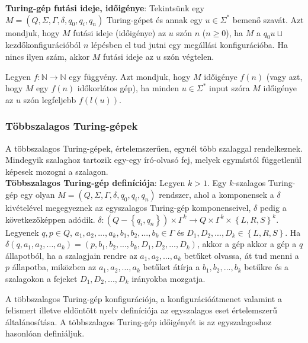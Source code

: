 \documentclass[margin=0px]{article}
\begin{document}
	\noindent \textbf{Turing-gép futási ideje, időigénye}:
	Tekintsünk egy $M = (Q, \Sigma, \Gamma, \delta, q_{0}, q_{i}, q_{n})$ Turing-gépet és annak egy
	$u \in \Sigma^{*}$ bemenő szavát. Azt mondjuk, hogy $M$ futási ideje (időigénye) az $u$ szón $n$ ($n \geq 0$),
	ha $M$ a $q_{0}u\sqcup$ kezdőkonfigurációból $n$ lépésben el tud jutni egy megállási konfigurációba. Ha nincs ilyen
	szám, akkor $M$ futási ideje az $u$ szón végtelen.
	
	Legyen $f : \mathbb{N} \to \mathbb{N}$ egy függvény. Azt mondjuk, hogy $M$ időigénye $f(n)$ (vagy azt, hogy $M$
	egy $f(n)$ időkorlátos gép), ha minden $u \in \Sigma^{*}$ input szóra $M$ időigénye az $u$ szón legfeljebb $f(l(u))$.
	
	\subsubsection{Többszalagos Turing-gépek}
	
	A többszalagos Turing-gépek, értelemszerűen, egynél több szalaggal rendelkeznek.
	Mindegyik szalaghoz tartozik egy-egy író-olvasó fej, melyek egymástól
	függetlenül képesek mozogni a szalagon.\\
	
	\noindent \textbf{Többszalagos Turing-gép definíciója}: Legyen $k > 1$. Egy $k$-szalagos Turing-gép egy olyan
	$M = (Q, \Sigma, \Gamma, \delta, q_{0}, q_{i}, q_{n})$ rendszer, ahol a komponensek a $\delta$ kivételével
	megegyeznek az egyszalagos Turing-gép komponenseivel, $\delta$ pedig a következőképpen adódik.
	$\delta : (Q - \left\{q_{i},q_{n}\right\}) \times \Gamma^{k} \to Q \times \Gamma^{k} \times \left\{L, R, S\right\}^{k}$.
	Legyenek $q, p \in Q$, $a_{1}, a_{2}, ... , a_{k}, b_{1}, b_{2}, ..., b_{k} \in \Gamma$ és
	$D_{1}, D_{2}, ..., D_{k} \in \left\{L, R, S\right\}$. Ha $\delta(q,a_{1}, a_{2}, ... , a_{k}) = (p,b_{1}, b_{2}, ..., b_{k}, D_{1}, D_{2}, ..., D_{k})$, akkor a gép akkor a gép a $q$ állapotból, ha a szalagjain rendre az
	$a_{1}, a_{2}, ... , a_{k}$ betűket olvassa, át tud menni a $p$ állapotba, miközben az
	$a_{1}, a_{2}, ... , a_{k}$ betűket átírja a $b_{1}, b_{2}, ... , b_{k}$ betűkre és a szalagokon a fejeket
	$D_{1}, D_{2}, ... , D_{k}$ irányokba mozgatja.
	
	A többszalagos Turing-gép konfigurációja, a konfigurációátmenet valamint a
	felismert illetve eldöntött nyelv definíciója az egyszalagos eset értelemszerű általánosítása.
	A többszalagos Turing-gép időigényét is az egyszalagoshoz hasonlóan	definiáljuk.\\
	
\end{document}
